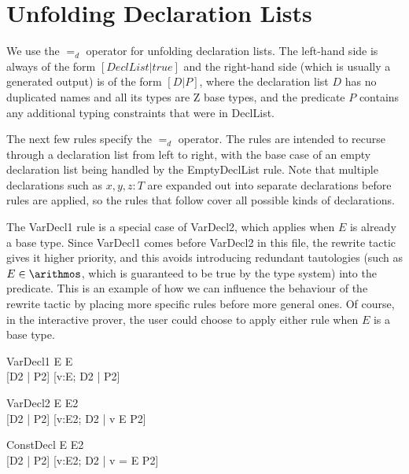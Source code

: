 \documentclass{article}
\newcommand{\declListUnfoldsTo}{\mathrel{=_d}}
\begin{document}
\section{Unfolding Declaration Lists}

We use the $\declListUnfoldsTo$ operator for unfolding declaration
lists.   The left-hand side is always of the form $[DeclList|true]$
and the right-hand side (which is usually a generated output) is
of the form $[D|P]$, where the declaration list $D$ has no duplicated
names and all its types are Z base types, and the predicate $P$
contains any additional typing constraints that were in DeclList.

The next few rules specify the $\declListUnfoldsTo$ operator.
The rules are intended to recurse through a declaration list from left
to right, with the base case of an empty declaration list being handled
by the EmptyDeclList rule.  Note that multiple declarations such as
$x,y,z:T$ are expanded out into separate declarations before rules
are applied, so the rules that follow cover all possible kinds
of declarations.

The VarDecl1 rule is a special case of VarDecl2, which applies when $E$ is
already a base type.  Since VarDecl1 comes before VarDecl2 in this file,
the rewrite tactic gives it higher priority, and this avoids introducing
redundant tautologies (such as $E \in \arithmos$, which is guaranteed to
be true by the type system) into the predicate.  This is an example of
how we can influence the behaviour of the rewrite tactic by placing more
specific rules before more general ones.  Of course, in the interactive
prover, the user could choose to apply either rule when $E$ is a base type.

\begin{zedrule}{VarDecl1}
   E \hasType \power E \\
   [D1 | true] \declListUnfoldsTo [D2 | P2]
\derives
   [v:E; D1 | true] \declListUnfoldsTo [v:E; D2 |  P2]
\end{zedrule}

\begin{zedrule}{VarDecl2}
   E \hasType \power E2 \\
   [D1 | true] \declListUnfoldsTo [D2 | P2]
\derives
   [v:E; D1 | true] \declListUnfoldsTo [v:E2; D2 |  v \in E \land P2]
\end{zedrule}

\begin{zedrule}{ConstDecl}
   E \hasType E2 \\
   [D1 | true] \declListUnfoldsTo [D2 | P2]
\derives
   [v==E; D1 | true] \declListUnfoldsTo [v:E2; D2 |  v = E \land P2]
\end{zedrule}
\end{document}
